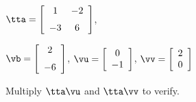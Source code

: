 {$\tta = \left[ \begin {array}{cc} 1&-2\\ \noalign{\medskip}-3&6 \end {array} \right] $, 

$\vb=\left[ \begin {array}{c} 2\\ \noalign{\medskip}-6 \end {array} \right] $, 
$\vu = \left[ \begin {array}{c} 0\\ -1 \end{array} \right]$, $\vv = \left[ \begin{array}{c} 2\\ 0 \end{array} \right]$ }
{Multiply $\tta\vu$ and $\tta\vv$ to verify.}




